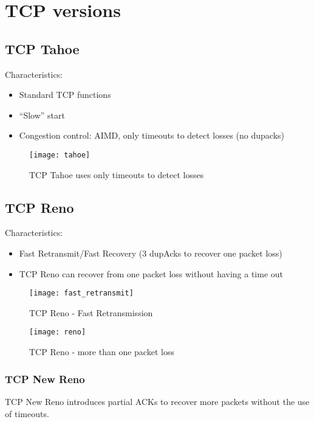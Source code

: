 \newpage
\section{TCP versions}

\subsection{TCP Tahoe}

Characteristics:

\begin{itemize}
  \item Standard TCP functions
  \item ``Slow'' start
  \item Congestion control: AIMD, only timeouts to detect losses (no dupacks)
\end{itemize}

\begin{figure}[H]
  \texttt{[image: tahoe]}
  \caption{TCP Tahoe uses only timeouts to detect losses}
\end{figure}

\subsection{TCP Reno}

Characteristics:

\begin{itemize}
  \item Fast Retransmit/Fast Recovery (3 dupAcks to recover one packet loss)
  \item TCP Reno can recover from one packet loss without having a time out
\end{itemize}

\begin{figure}[H]
  \texttt{[image: fast\_retransmit]}
  \caption{TCP Reno - Fast Retransmission}
\end{figure}

\begin{figure}[H]
  \texttt{[image: reno]}
  \caption{TCP Reno - more than one packet loss}
\end{figure}

\subsubsection{TCP New Reno}

TCP New Reno introduces partial ACKs to recover more packets without the use of
timeouts.

